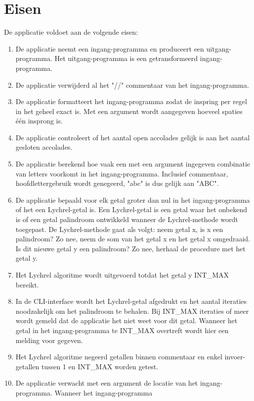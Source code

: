 \documentclass[10pt]{article}
\begin{document}
\section{Eisen}
\label{sec:eisen}
De applicatie voldoet aan de volgende eisen:
\begin{enumerate}
      \item De applicatie neemt een ingang-programma en produceert een uitgang-programma. Het uitgang-programma is een
            getransformeerd ingang-programma.
      \item De applicatie verwijderd al het "//" commentaar van het ingang-programma.
      \item De applicatie formatteert het ingang-programma zodat de inspring per regel in het geheel exact is. Met een
            argument wordt aangegeven hoeveel spaties \'e\'en insprong is.
      \item De applicatie controleert of het aantal open accolades gelijk is aan het aantal gesloten accolades.
      \item De applicatie berekend hoe vaak een met een argument ingegeven combinatie van letters voorkomt in het
            ingang-programma. Inclusief commentaar, hoofdlettergebruik wordt genegeerd, "abc" is dus gelijk aan
            "ABC".
      \item De applicatie bepaald voor elk getal groter dan nul in het ingang-programma of het een Lychrel-getal is.
            Een Lychrel-getal is een getal waar het onbekend is of een getal palindroom ontwikkeld wanneer de Lychrel-methode wordt
            toegepast. De Lychrel-methode gaat als volgt: neem getal x, is x een palindroom? Zo nee, neem de som van het getal x en
            het getal x omgedraaid. Is dit nieuwe getal y een palindroom? Zo nee, herhaal de procedure met het getal y.
      \item Het Lychrel algoritme wordt uitgevoerd totdat het getal y INT\_MAX bereikt.
      \item In de CLI-interface wordt het Lychrel-getal afgedrukt en het aantal
            iteraties
            noodzakelijk om het palindroom te behalen. Bij INT\_MAX iteraties of meer wordt gemeld dat de applicatie
            het
            niet weet voor dit
            getal. Wanneer het getal in het ingang-programma te INT\_MAX overtreft wordt hier een melding voor gegeven.
      \item Het Lychrel algoritme negeerd getallen binnen commentaar en enkel invoer-getallen tussen 1 en INT\_MAX
            worden getest.
      \item De applicatie verwacht met een argument de locatie van het ingang-programma. Wanneer het ingang-programma

\end{enumerate}
\end{document}
